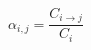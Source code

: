 \documentclass[12pt]{article}
\begin{document}
\begin{equation}
    \nonumber \alpha_{i,j} = \frac{C_{i \rightarrow j}}{C_i}
\end{equation}
\end{document}
